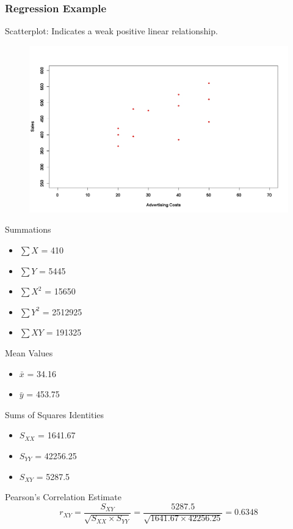 \documentclass[]{report}
\begin{document}
\subsubsection{Regression Example}
Scatterplot: Indicates a weak positive linear relationship.
\begin{center}
	\begin{figure}
		\includegraphics[scale=0.3]{images/12Bplot1.jpeg}\\
	\end{figure}
\end{center}



Summations
\begin{itemize}
	\item $\sum X$ = 410
	\item $\sum Y$ = 5445
	\item $\sum X^2$ = 15650
	\item $\sum Y^2$ = 2512925
	\item $\sum XY$ = 191325
\end{itemize}
Mean Values
\begin{itemize}
	\item $\bar{x}$ = 34.16
	\item $\bar{y}$ = 453.75
\end{itemize}



Sums of Squares Identities
\begin{itemize}
	\item $S_{XX}$ = 1641.67
	\item $S_{YY}$ = 42256.25
	\item $S_{XY}$ = 5287.5
\end{itemize}
Pearson's Correlation Estimate
\[ r_{XY} = \frac{S_{XY}}{\sqrt{S_{XX} \times S_{YY}}} = \frac{5287.5}{\sqrt{1641.67 \times 42256.25}} = 0.6348 \]
\end{document}
